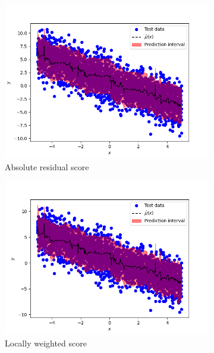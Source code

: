 \documentclass[11pt, titlepage]{article} %
\numberwithin{equation}{section}
\theoremstyle{definition}
\numberwithin{theorem}{section}
\numberwithin{lemma}{section}
\numberwithin{corollary}{section}
\numberwithin{proposition}{section}
\numberwithin{definition}{section}
\numberwithin{remark}{section}
\begin{document}
\begin{figure}[H]
    \centering
    \begin{subfigure}{0.32\textwidth}
    \includegraphics[width=\linewidth]{figures/2_4_homoscedastic_RF.png}    
    \caption{Absolute residual score} \label{fig:2_4_homoscedastic_RF}
    \end{subfigure}
    \begin{subfigure}{0.32\textwidth}
    \includegraphics[width=\linewidth]{figures/2_4_homoscedastic_LW.png}
    \caption{Locally weighted score} \label{fig:2_4_homoscedastic_LW}
    \end{subfigure}
    \begin{subfigure}{0.32\textwidth}

\end{subfigure}
\end{figure}
\end{document}
